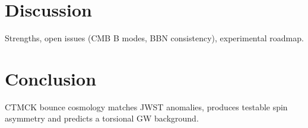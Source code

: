 \documentclass[aps,prd,reprint,amsmath,amssymb,nofootinbib]{revtex4-2}
\begin{document}
\section{Discussion}\label{sec:discussion}
Strengths, open issues (CMB B modes, BBN consistency), experimental roadmap.

\section{Conclusion}\label{sec:conclusion}
CTMCK bounce cosmology matches JWST anomalies, produces testable spin asymmetry and predicts a torsional GW background.



\end{document}
